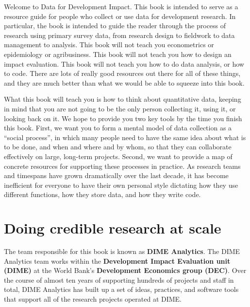 \begin{fullwidth}
Welcome to Data for Development Impact.
This book is intended to serve as a resource guide
for people who collect or use data for development research.
In particular, the book is intended to guide the reader
through the process of research using primary survey data,
from research design to fieldwork to data management to analysis.
This book will not teach you econometrics or epidemiology or agribusiness.
This book will not teach you how to design an impact evaluation.
This book will not teach you how to do data analysis, or how to code.
There are lots of really good resources out there for all of these things,
and they are much better than what we would be able to squeeze into this book.

What this book will teach you is how to think about quantitative data,
keeping in mind that you are not going to be the only person
collecting it, using it, or looking back on it.
We hope to provide you two key tools by the time you finish this book.
First, we want you to form a mental model of data collection as a ``social process'',
in which many people need to have the same idea about what is to be done, and when and where and by whom,
so that they can collaborate effectively on large, long-term projects.
Second, we want to provide a map of concrete resources for supporting these processes in practice.
As research teams and timespans have grown dramatically over the last decade,
it has become inefficient for everyone to have their own personal style
dictating how they use different functions, how they store data, and how they write code.
\end{fullwidth}


\section{Doing credible research at scale}

The team responsible for this book is known as \textbf{DIME Analytics}.
The DIME Analytics team works within the \textbf{Development Impact Evaluation unit (DIME)}
at the World Bank's \textbf{Development Economics group (DEC)}.
Over the course of almost ten years of supporting hundreds of projects and staff in total,
DIME Analytics has built up a set of ideas, practices, and software tools
that support all of the research projects operated at DIME.

